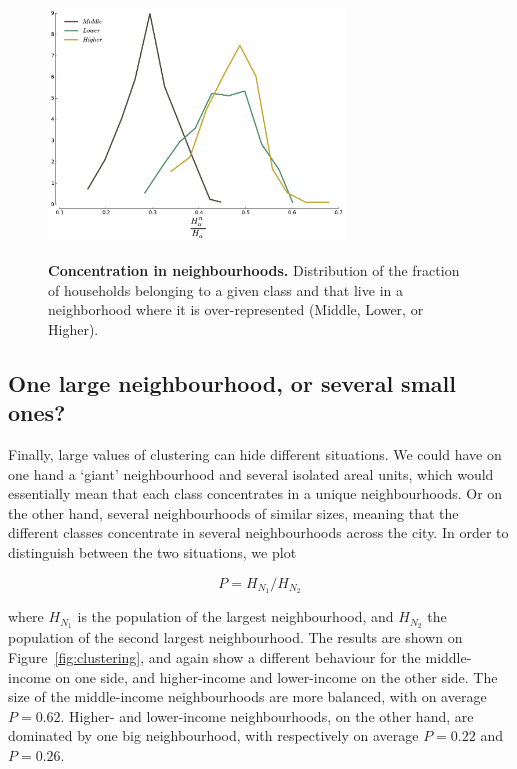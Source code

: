 \begin{figure} 
    \centering
    \includegraphics[width=0.7\textwidth]{gfx/chapter-segregation/neighbourhoods_content.pdf}\\
    \caption{{\bf Concentration in neighbourhoods.} Distribution of the fraction of households belonging to a
      given class and that live in a neighborhood where it is
      over-represented (Middle, Lower, or Higher).} 
        \label{fig:content} 
\end{figure}



\subsection{One large neighbourhood, or several small ones?}
\label{sub:one_large_neighbourhood_or_several_small_ones_}

Finally, large values of clustering can hide different situations. We
could have on one hand a `giant' neighbourhood and several isolated areal units, which
would essentially mean that each class concentrates in a unique
neighbourhoods. Or on the other hand, several neighbourhoods of
similar sizes, meaning that the different classes concentrate in
several neighbourhoods across the city. In order to distinguish
between the two situations, we plot

\begin{equation} 
    P = H_{N_1} / H_{N_2} 
\end{equation}

where $H_{N_1}$ is the population of the largest neighbourhood, and $H_{N_2}$
the population of the second largest neighbourhood. The results are shown on
Figure~\ref{fig:clustering}, and again show a different behaviour for the
middle-income on one side, and higher-income and lower-income on the other side.
The size of the middle-income neighbourhoods are more balanced, with on average
$P=0.62$.  Higher- and lower-income neighbourhoods, on the other hand, are
dominated by one big neighbourhood, with respectively on average $P=0.22$ and
$P=0.26$.

